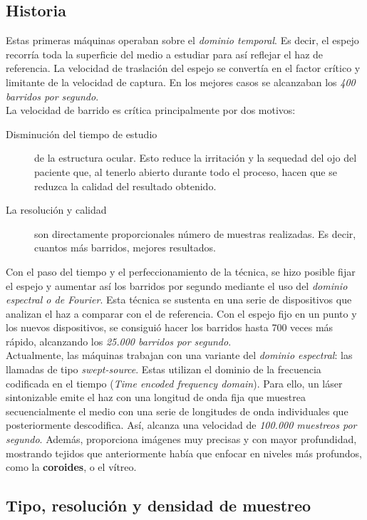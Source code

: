 \subsection{Historia}
Estas primeras máquinas operaban sobre el \emph{dominio temporal}. Es decir,
el espejo recorría toda la superficie del medio a estudiar para así
reflejar el haz de referencia. La velocidad de traslación del espejo
se convertía en el factor crítico y limitante de la velocidad de
captura. En los mejores casos se alcanzaban los \emph{400 barridos por segundo}.\\
La velocidad de barrido es crítica principalmente por dos motivos:
\begin{description}
\item [Disminución del tiempo de estudio] de la estructura ocular. Esto
  reduce la irritación y la sequedad del ojo del paciente que, al
  tenerlo abierto durante todo el proceso, hacen que se reduzca la
  calidad del resultado obtenido.
\item [La resolución y calidad] son directamente proporcionales
  número de muestras realizadas. Es decir, cuantos más barridos,
  mejores resultados.
\end{description}
Con el paso del tiempo y el perfeccionamiento de la técnica, se hizo
posible fijar el espejo y aumentar así los barridos por segundo
mediante el uso del \emph{dominio espectral o de Fourier}. Esta
técnica se sustenta en una serie de dispositivos que analizan el haz a
comparar con el de referencia. Con el espejo fijo en un punto y los
nuevos dispositivos, se consiguió hacer los barridos hasta 700 veces
más rápido, alcanzando los \emph{25.000 barridos por segundo}.\\
Actualmente, las máquinas trabajan con una variante del
\emph{dominio espectral}: las llamadas de tipo
\emph{swept-source}. Estas utilizan el dominio de la frecuencia codificada
en el tiempo (\emph{Time encoded frequency domain}). Para ello, un
láser sintonizable emite el haz con una longitud de onda fija que
muestrea secuencialmente el medio con una serie de longitudes de onda
individuales que posteriormente descodifica. Así, alcanza una velocidad de
\emph{100.000 muestreos por segundo}. Además, proporciona imágenes muy
precisas y con mayor profundidad, mostrando tejidos que anteriormente
había que enfocar en niveles más profundos, como la \textbf{coroides}, o
el vítreo.

\subsection{Tipo, resolución y densidad de muestreo}
